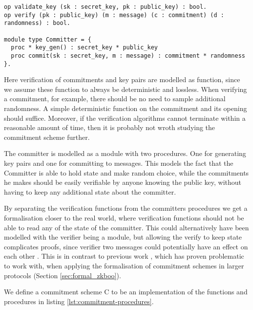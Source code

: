 \begin{lstlisting}[float,label=lst:commitment-procedures,caption= Key-Based commitment specification]
op validate_key (sk : secret_key, pk : public_key) : bool.
op verify (pk : public_key) (m : message) (c : commitment) (d : randomness) : bool.

module type Committer = {
  proc * key_gen() : secret_key * public_key
  proc commit(sk : secret_key, m : message) : commitment * randomness
}.
\end{lstlisting}
Here verification of commitments and key pairs are modelled as function, since
we assume these function to always be deterministic and lossless.
When verifying a commitment, for example, there should be no need to sample
additional randomness. A simple deterministic function on the commitment and its
opening should suffice. Moreover, if the
verification algorithms cannot terminate within a reasonable amount of time,
then it is probably not wroth studying the commitment scheme further.

The committer is modelled as a module with two procedures. One for generating
key pairs and one for committing to messages. This models the fact that the Committer
is able to hold state and make random choice, while the commitments he makes
should be easily verifiable by anyone knowing the public key, without having to
keep any additional state about the committer.

By separating the verification functions from the committers procedures we get a
formalisation closer to the real world, where verification functions should not
be able to read any of the state of the committer. This could alternatively have
been modelled with the verifier being a module, but allowing the verify to keep
state complicates proofs, since verifier two messages could potentially have an
effect on each other .
This is in contrast to previous work \cite{DBLP:journals/corr/MetereD17}, which
has proven problematic to work with, when applying the formalisation of
commitment schemes in larger protocols (Section \ref{sec:formal_zkboo}).

We define a commitment scheme C to be an implementation of the functions and procedures in listing \ref{lst:commitment-procedures}.



